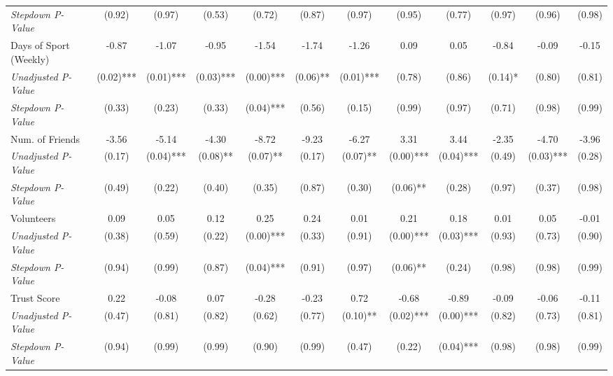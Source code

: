 \begin{tabular}{l c c c c c c c c c c c}
\quad \textit{Stepdown P-Value} & (0.92) & (0.97) & (0.53) & (0.72) & (0.87) & (0.97) & (0.95) & (0.77) & (0.97) & (0.96) & (0.98) \\
Days of Sport (Weekly) & -0.87 & -1.07 & -0.95 & -1.54 & -1.74 & -1.26 & 0.09 & 0.05 & -0.84 & -0.09 & -0.15 \\
\quad \textit{Unadjusted P-Value} & (0.02)*** & (0.01)*** & (0.03)*** & (0.00)*** & (0.06)** & (0.01)*** & (0.78) & (0.86) & (0.14)* & (0.80) & (0.81) \\
\quad \textit{Stepdown P-Value} & (0.33) & (0.23) & (0.33) & (0.04)*** & (0.56) & (0.15) & (0.99) & (0.97) & (0.71) & (0.98) & (0.99) \\
Num. of Friends & -3.56 & -5.14 & -4.30 & -8.72 & -9.23 & -6.27 & 3.31 & 3.44 & -2.35 & -4.70 & -3.96 \\
\quad \textit{Unadjusted P-Value} & (0.17) & (0.04)*** & (0.08)** & (0.07)** & (0.17) & (0.07)** & (0.00)*** & (0.04)*** & (0.49) & (0.03)*** & (0.28) \\
\quad \textit{Stepdown P-Value} & (0.49) & (0.22) & (0.40) & (0.35) & (0.87) & (0.30) & (0.06)** & (0.28) & (0.97) & (0.37) & (0.98) \\
Volunteers & 0.09 & 0.05 & 0.12 & 0.25 & 0.24 & 0.01 & 0.21 & 0.18 & 0.01 & 0.05 & -0.01 \\
\quad \textit{Unadjusted P-Value} & (0.38) & (0.59) & (0.22) & (0.00)*** & (0.33) & (0.91) & (0.00)*** & (0.03)*** & (0.93) & (0.73) & (0.90) \\
\quad \textit{Stepdown P-Value} & (0.94) & (0.99) & (0.87) & (0.04)*** & (0.91) & (0.97) & (0.06)** & (0.24) & (0.98) & (0.98) & (0.99) \\
Trust Score & 0.22 & -0.08 & 0.07 & -0.28 & -0.23 & 0.72 & -0.68 & -0.89 & -0.09 & -0.06 & -0.11 \\
\quad \textit{Unadjusted P-Value} & (0.47) & (0.81) & (0.82) & (0.62) & (0.77) & (0.10)** & (0.02)*** & (0.00)*** & (0.82) & (0.73) & (0.81) \\
\quad \textit{Stepdown P-Value} & (0.94) & (0.99) & (0.99) & (0.90) & (0.99) & (0.47) & (0.22) & (0.04)*** & (0.98) & (0.98) & (0.99) \\
\bottomrule
\end{tabular}
